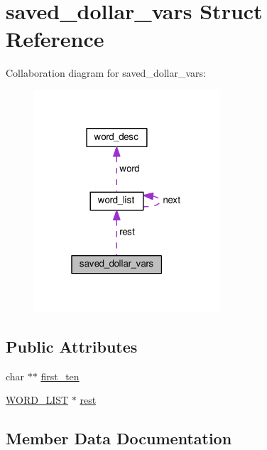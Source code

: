 \hypertarget{structsaved__dollar__vars}{}\section{saved\+\_\+dollar\+\_\+vars Struct Reference}
\label{structsaved__dollar__vars}


Collaboration diagram for saved\+\_\+dollar\+\_\+vars\+:
\nopagebreak
\begin{figure}[H]
\begin{center}
\leavevmode
\includegraphics[width=196pt]{structsaved__dollar__vars__coll__graph}
\end{center}
\end{figure}
\subsection*{Public Attributes}
\begin{DoxyCompactItemize}
\item 
char $\ast$$\ast$ \hyperlink{structsaved__dollar__vars_a34da2a52790b0c2d0c5f205188935406}{first\+\_\+ten}
\item 
\hyperlink{command_8h_ac42a7b781459884316a1f2ffe79e8a62}{W\+O\+R\+D\+\_\+\+L\+I\+ST} $\ast$ \hyperlink{structsaved__dollar__vars_a92f46b81a83fba6817445d87ef1f1ba7}{rest}
\end{DoxyCompactItemize}


\subsection{Member Data Documentation}
